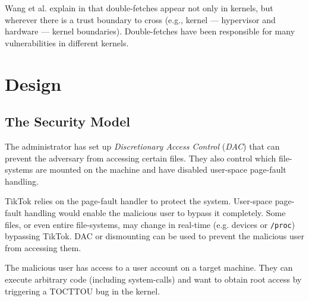 Wang et al. explain in \cite{wang2018survey} that double-fetches appear not only
in kernels, but wherever there is a trust boundary to cross (e.g., kernel ---
hypervisor\cite{wilhelm2016xenpwn} and hardware --- kernel
boundaries\cite{lu2018untrusted}). Double-fetches have been responsible for many
vulnerabilities in different kernels\cite{jurczyk2013bochspwn, wang2018survey}.

\section{Design}
\label{sec:design}

\subsection{The Security Model}
\label{subsec:secmodel}

The administrator has set up \emph{Discretionary Access Control} (\emph{DAC})
that can prevent the adversary from accessing certain files. They also control
which file-systems are mounted on the machine and have disabled user-space
page-fault handling. 

TikTok relies on the page-fault handler to protect the system. User-space
page-fault handling would enable the malicious user to bypass it completely.
Some files, or even entire file-systems, may change in real-time (e.g. devices
or \texttt{/proc}) bypassing TikTok. DAC or dismounting can be used to prevent
the malicious user from accessing them.

The malicious user has access to a user account on a target machine. They can
execute arbitrary code (including system-calls) and want to obtain root access
by triggering a TOCTTOU bug in the kernel.

